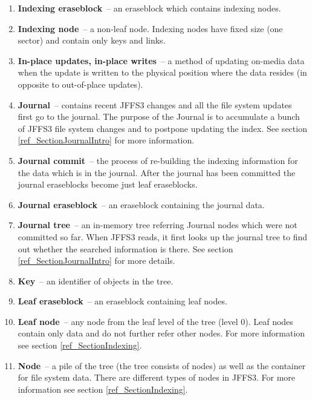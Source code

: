\documentclass[12pt,a4paper,oneside,titlepage]{article}
\begin{document}
\begin{enumerate}
\item \textbf{Indexing eraseblock}~-- an eraseblock which contains indexing
nodes.

\item \textbf{Indexing node}~-- a \mbox{non-leaf} node. Indexing nodes have
fixed size (one sector) and contain only keys and links.

\item \textbf{In-place updates, in-place writes}~-- a method of updating
\mbox{on-media} data when the update is written to the physical position where
the data resides (in opposite to \mbox{out-of-place} updates).

\item \textbf{Journal}~-- contains recent JFFS3 changes and all the file system
updates first go to the journal. The purpose of the Journal is to accumulate a
bunch of JFFS3 file system changes and to postpone updating the index. See
section \ref{ref_SectionJournalIntro} for more information.

\item \textbf{Journal commit}~-- the process of \mbox{re-building} the indexing
information for the data which is in the journal. After the journal has been
committed the journal eraseblocks become just leaf eraseblocks.

\item \textbf{Journal eraseblock}~-- an eraseblock containing the journal data.

\item \textbf{Journal tree}~-- an \mbox{in-memory} tree referring Journal nodes
which were not committed so far. When JFFS3 reads, it first looks up the
journal tree to find out whether the searched information is there.  See
section \ref{ref_SectionJournalIntro} for more details.

\item \textbf{Key}~-- an identifier of objects in the tree.

\item \textbf{Leaf eraseblock}~-- an eraseblock containing leaf nodes.

\item \textbf{Leaf node}~-- any node from the leaf level of the tree (level 0).
Leaf nodes contain only data and do not further refer other nodes. For more
information see section \ref{ref_SectionIndexing}.

\item \textbf{Node}~-- a pile of the tree (the tree consists of nodes) as well
as the container for file system data. There are different types of nodes in
JFFS3. For more information see section \ref{ref_SectionIndexing}.


\end{enumerate}
\end{document}
